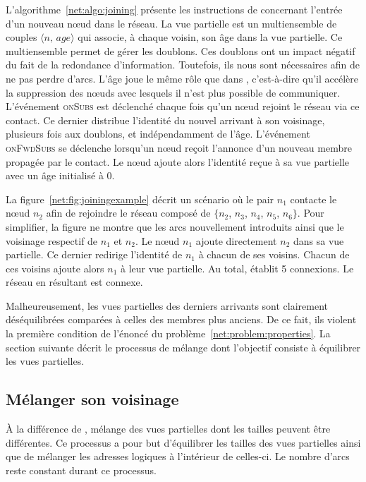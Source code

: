 L'algorithme~\ref{net:algo:joining} présente les instructions de \SPRAY
concernant l'entrée d'un nouveau nœud dans le réseau. La vue partielle est un
multiensemble de couples $\langle n,\, age\rangle$ qui associe, à chaque voisin,
son âge dans la vue partielle. Ce multiensemble permet de gérer les
doublons. Ces doublons ont un impact négatif du fait de la redondance
d'information.  Toutefois, ils nous sont nécessaires afin de ne pas perdre
d'arcs. L'âge joue le même rôle que dans \CYCLON, c'est-à-dire qu'il accélère la
suppression des nœuds avec lesquels il n'est plus possible de
communiquer. L'événement \textsc{onSubs} est déclenché chaque fois qu'un nœud
rejoint le réseau via ce contact. Ce dernier distribue l'identité du nouvel
arrivant à son voisinage, plusieurs fois aux doublons, et indépendamment de
l'âge. L'événement \textsc{onFwdSubs} se déclenche lorsqu'un nœud reçoit
l'annonce d'un nouveau membre propagée par le contact. Le nœud ajoute alors
l'identité reçue à sa vue partielle avec un âge initialisé à $0$.

La figure~\ref{net:fig:joiningexample} décrit un scénario où le pair $n_1$
contacte le nœud $n_2$ afin de rejoindre le réseau composé de $\{n_2$, $n_3$,
$n_4$, $n_5$, $n_6\}$. Pour simplifier, la figure ne montre que les arcs
nouvellement introduits ainsi que le voisinage respectif de $n_1$ et $n_2$. Le
nœud $n_1$ ajoute directement $n_2$ dans sa vue partielle. Ce dernier redirige
l'identité de $n_1$ à chacun de ses voisins.  Chacun de ces voisins ajoute alors
$n_1$ à leur vue partielle. Au total, \SPRAY établit 5 connexions. Le réseau en
résultant est connexe.

Malheureusement, les vues partielles des derniers arrivants sont clairement
déséquilibrées comparées à celles des membres plus anciens. De ce fait, ils
violent la première condition de l'énoncé du
problème~\ref{net:problem:properties}. La section suivante décrit le processus
de mélange dont l'objectif consiste à équilibrer les vues partielles.

\subsection{Mélanger son voisinage}
\label{net:subsec:shuffling}

À la différence de \CYCLON, \SPRAY mélange des vues partielles dont les tailles
peuvent être différentes. Ce processus a pour but d'équilibrer les tailles des
vues partielles ainsi que de mélanger les adresses logiques à l'intérieur de
celles-ci. Le nombre d'arcs reste constant durant ce processus.

